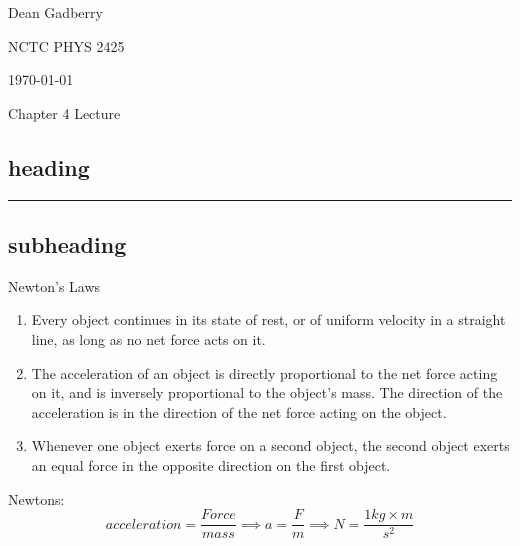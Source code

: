\documentclass[12pt,a4paper,english]{article}
\begin{document}
\begin{flushright}
  Dean Gadberry

  NCTC PHYS 2425

  \today
\end{flushright}
\begin{center}
  {\large Chapter 4 Lecture}
\end{center}
\begin{flushleft}

  \section*{heading}
  \hrule
  \subsection{subheading}

  Newton's Laws
  \begin{enumerate}
      \item Every object continues in its state of rest, or of uniform velocity in a straight line, as long as no net force acts on it.
      \item The acceleration of an object is directly proportional to the net force acting on it, and is inversely proportional to the object's mass. The direction of the acceleration is in the direction of the net force acting on the object.
      \item Whenever one object exerts force on a second object, the second object exerts an equal force in the opposite direction on the first object.
  \end{enumerate}

  Newtons:
  \[
      acceleration=\frac{Force}{mass}\implies
      a=\frac{F}{m}\implies
      N=\frac{1kg\times m}{s^2}
  \]
\end{flushleft}
\end{document}

